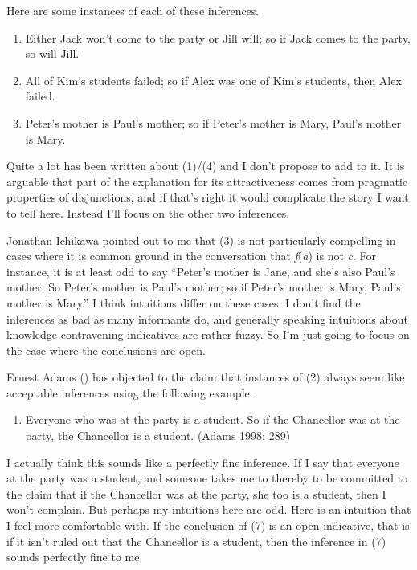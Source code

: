 \documentclass[
  10pt,
  letterpaper,
  DIV=11,
  numbers=noendperiod,
  twoside]{scrartcl}
\providecommand{\tightlist}{%
  \setlength{\itemsep}{0pt}\setlength{\parskip}{0pt}}\usepackage{longtable,booktabs,array}
\begin{document}
Here are some instances of each of these inferences.

\begin{enumerate}
\def\labelenumi{\arabic{enumi}.}
\setcounter{enumi}{3}
\tightlist
\item
  Either Jack won't come to the party or Jill will; so if Jack comes to
  the party, so will Jill.
\item
  All of Kim's students failed; so if Alex was one of Kim's students,
  then Alex failed.
\item
  Peter's mother is Paul's mother; so if Peter's mother is Mary, Paul's
  mother is Mary.
\end{enumerate}

Quite a lot has been written about (1)/(4) and I don't propose to add to
it. It is arguable that part of the explanation for its attractiveness
comes from pragmatic properties of disjunctions, and if that's right it
would complicate the story I want to tell here. Instead I'll focus on
the other two inferences.

Jonathan Ichikawa pointed out to me that (3) is not particularly
compelling in cases where it is common ground in the conversation that
\emph{f}(\emph{a}) is not \emph{c}. For instance, it is at least odd to
say ``Peter's mother is Jane, and she's also Paul's mother. So Peter's
mother is Paul's mother; so if Peter's mother is Mary, Paul's mother is
Mary.'' I think intuitions differ on these cases. I don't find the
inferences as bad as many informants do, and generally speaking
intuitions about knowledge-contravening indicatives are rather fuzzy. So
I'm just going to focus on the case where the conclusions are open.

Ernest Adams () has objected to the claim
that instances of (2) always seem like acceptable inferences using the
following example.

\begin{enumerate}
\def\labelenumi{\arabic{enumi}.}
\setcounter{enumi}{6}
\tightlist
\item
  Everyone who was at the party is a student. So if the Chancellor was
  at the party, the Chancellor is a student. (Adams 1998: 289)
\end{enumerate}

I actually think this sounds like a perfectly fine inference. If I say
that everyone at the party was a student, and someone takes me to
thereby to be committed to the claim that if the Chancellor was at the
party, she too is a student, then I won't complain. But perhaps my
intuitions here are odd. Here is an intuition that I feel more
comfortable with. If the conclusion of (7) is an open indicative, that
is if it isn't ruled out that the Chancellor is a student, then the
inference in (7) sounds perfectly fine to me.
\end{document}
